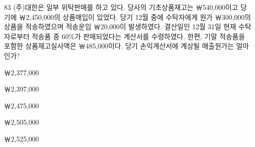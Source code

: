 \begin{question}{83}
(주)대한은 일부 위탁판매를 하고 있다. 당사의 기초상품재고는 ￦540,000이고 당기에 ￦2,450,000의 상품매입이 있었다. 당기 12월 중에 수탁자에게 원가 ￦300,000의 상품을 적송하였으며 적송운임 ￦20,000이 발생하였다. 결산일인 12월 31일 현재 수탁자로부터 적송품 중 60\%가 판매되었다는 계산서를 수령하였다. 한편, 기말 적송품을 포함한 상품재고실사액은 ￦485,000이다. 당기 손익계산서에 계상될 매출원가는 얼마인가?
\begin{choices}
  \item ￦2,377,000
  \item ￦2,397,000
  \item ￦2,475,000
  \item ￦2,505,000
  \item ￦2,525,000
\end{choices}
\end{question}
